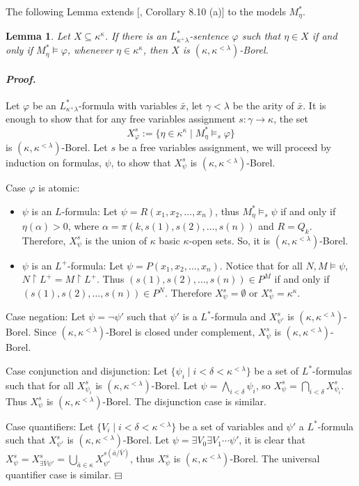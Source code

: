 \documentclass[12pt,a4paper]{amsart}
\newtheorem{lemma}[thm]{Lemma}
\theoremstyle{definition}
\theoremstyle{remark}
\renewcommand{\mid}{\mathrel{|}\allowbreak}
\renewcommand{\restriction}{\mathbin\upharpoonright}
\newenvironment{cproof}{\paragraph{\emph{Proof.\,}}}{\hfill{$\boxminus$}\par\vspace{2mm}}
\begin{document}
The following Lemma extends [\cite{MR4409720}, Corollary 8.10 (a)] to the models $M^*_\eta$.

\begin{lemma}\label{5.1}
    Let $X\subseteq \kappa^\kappa$. If there is an $L^*_{\kappa^+\lambda}$-sentence $\varphi$  such that $\eta\in X$ if and only if $M_\eta^*\models \varphi$, whenever $\eta\in\kappa^\kappa$, then $X$ is $(\kappa,\kappa^{< \lambda})$-Borel.
\end{lemma}

\begin{cproof}
    Let $\varphi$ be an $L^*_{\kappa^+\lambda}$-formula with variables $\bar{x}$, let $\gamma<\lambda$ be the arity of $\bar{x}$. It is enough to show that for any free variables assignment $s:\gamma\rightarrow \kappa$, the set $$X^s_\varphi:=\{\eta\in \kappa^\kappa\mid M_\eta^*\models_s \varphi\}$$ is $(\kappa,\kappa^{< \lambda})$-Borel. 
    Let $s$ be a free variables assignment, we will proceed by induction on formulas, $\psi$, to show that $X^s_\psi$ is $(\kappa,\kappa^{< \lambda})$-Borel.

    Case $\varphi$ is atomic: 
    \begin{itemize}
        \item $\psi$ is an $L$-formula: Let $\psi=R(x_1,x_2,\ldots , x_n)$, thus $M_\eta^*\models_s \psi$ if and only if $\eta(\alpha)>0$, where $\alpha=\pi(k,s(1),s(2),\ldots , s(n))$ and $R=Q_k$. Therefore, $X^s_\psi$ is the union of $\kappa$ basic $\kappa$-open sets. So, it is $(\kappa,\kappa^{< \lambda})$-Borel. 
        \item $\psi$ is an $L^+$-formula: Let $\psi=P(x_1,x_2,\ldots , x_n)$. Notice that for all $N,M\models \psi$, $N\restriction L^+= M\restriction L^+$. Thus $(s(1),s(2),\ldots , s(n))\in P^M$ if and only if $(s(1),s(2),\ldots , s(n))\in P^N$. Therefore $X^s_\psi=\emptyset$ or $X^s_\psi=\kappa^\kappa$.
    \end{itemize}
    
    Case negation: Let $\psi=\neg \psi'$ such that $\psi'$ is a $L^*$-formula and $X^s_{\psi'}$ is $(\kappa,\kappa^{< \lambda})$-Borel. Since $(\kappa,\kappa^{< \lambda})$-Borel is closed under complement, $X^s_\psi$ is $(\kappa,\kappa^{< \lambda})$-Borel. 
    
    Case conjunction and disjunction: Let $\{\psi_i\mid i<\delta<\kappa^{< \lambda}\}$ be a set of $L^*$-formulas such that for all $X^s_{\psi_i}$ is $(\kappa,\kappa^{< \lambda})$-Borel. Let $\psi=\bigwedge_{i<\delta}\psi_i$, so $X^s_\psi=\bigcap_{i<\delta}X^s_{\psi_i}$. Thus $X^s_\psi$ is $(\kappa,\kappa^{< \lambda})$-Borel. The disjunction case is similar.

    Case quantifiers: Let $\{V_i\mid i<\delta<\kappa^{< \lambda}\}$ be a set of variables and $\psi'$ a $L^*$-formula such that $X^s_{\psi'}$ is $(\kappa,\kappa^{< \lambda})$-Borel. Let $\psi=\exists V_0 \exists V_1 \cdots \psi'$, it is clear that $X^s_\psi=X^s_{\exists\bar{V} \psi'}=\bigcup_{\bar a\in \kappa}X^{s(\bar a /\bar V)}_{\psi'}$, thus $X^s_\psi$ is $(\kappa,\kappa^{< \lambda})$-Borel. The universal quantifier case is similar.
\end{cproof}
\end{document}
